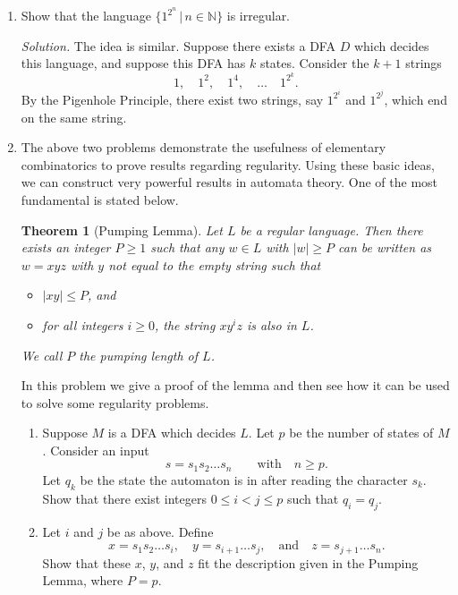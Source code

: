 \documentclass[11pt]{article}
\newtheorem{thm}{Theorem}[section]
\newcounter{enum}
\newcommand{\solution}
{
\vspace{5pt}
\noindent\textit{Solution.}\qquad
}
\begin{document}
\begin{enumerate}
\setcounter{enumi}{\theenum}

\item Show that the language $\{1^{2^n}\,|\,n\in\mathbb{N}\}$ is irregular.

\solution The idea is similar.  Suppose there exists a DFA $D$ which decides this language, and suppose this DFA has $k$ states.  Consider the $k+1$ strings \[1,\quad 1^2,\quad 1^4,\quad\ldots\quad 1^{2^k}.\] By the Pigenhole Principle, there exist two strings, say $1^{2^i}$ and $1^{2^j}$, which end on the same string.  

\item The above two problems demonstrate the usefulness of elementary combinatorics to prove results regarding regularity.  Using these basic ideas, we can construct very powerful results in automata theory.  One of the most fundamental is stated below.

\begin{thm}[Pumping Lemma] Let $L$ be a regular language.  Then there exists an integer $P\geq 1$ such that any $w\in L$ with $|w|\geq P$ can be written as $w=xyz$ with $y$ not equal to the empty string such that

\begin{itemize}

\item $|xy|\leq P$, and

\item for all integers $i\geq 0$, the string $xy^iz$ is also in $L$.

\end{itemize}

We call $P$ the \textit{pumping length} of $L$.
\end{thm}

In this problem we give a proof of the lemma and then see how it can be used to solve some regularity problems.

\begin{enumerate}

\item Suppose $M$ is a DFA which decides $L$.  Let $p$ be the number of states of $M$.  Consider an input \[s=s_1s_2\ldots s_n\qquad\text{with}\quad n\geq p.\] Let $q_k$ be the state the automaton is in after reading the character $s_k$.  Show that there exist integers $0\leq i < j\leq p$ such that $q_i=q_j$.

\item Let $i$ and $j$ be as above.  Define \[x=s_1s_2\ldots s_i,\quad y=s_{i+1}\ldots s_j,\quad\text{and}\quad z = s_{j+1}\ldots s_n.\] Show that these $x$, $y$, and $z$ fit the description given in the Pumping Lemma, where $P=p$.


\end{enumerate}
\end{enumerate}
\end{document}

